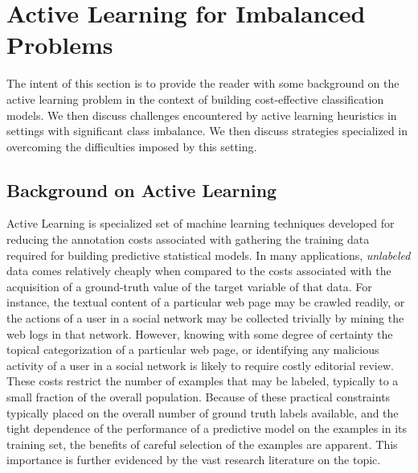 \section{Active Learning for Imbalanced Problems}
\label{sec:related}
The intent of this section is to provide the reader with some background on the active learning problem in the context of building cost-effective classification models. We then discuss challenges encountered by active learning heuristics in settings with significant class imbalance. We then discuss strategies specialized in overcoming the difficulties imposed by this setting.


\subsection{Background on Active Learning}
\label{sec:background}
Active Learning is specialized set of machine learning techniques developed for reducing the annotation costs associated with gathering the training data required for building predictive statistical models. In many applications, {\em unlabeled} data comes relatively cheaply when compared to the costs associated with the  acquisition of a ground-truth value of the target variable of that data. For instance, the textual content of a particular web page may be crawled readily, or the actions of a user in a social network may be collected trivially by mining the web logs in that network. However, knowing with some degree of certainty the topical categorization of a particular web page, or identifying any malicious activity of a user in a social network is likely to require costly editorial review. These costs restrict the number of examples that may be labeled, typically to a small fraction of the overall population. Because of these practical constraints typically placed on the overall number of ground truth labels available, and the tight dependence of the performance of a predictive model on the examples in its training set, the benefits of careful selection of the examples are apparent. This importance is further evidenced by the vast research literature on the topic.

